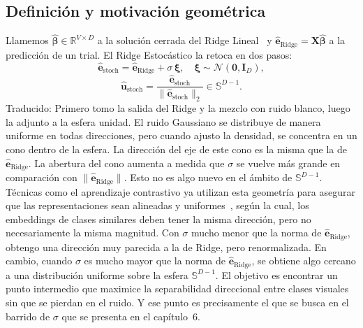 \subsection{Definición y motivación geométrica}

Llamemos $\hat{\boldsymbol{\beta}}\in\mathbb{R}^{V\times D}$ a la solución cerrada del Ridge 
Lineal~\cite{hoerl1970ridge,tikhonov1977solutions} y $\hat{\mathbf{e}}_{\text{Ridge}} = \mathbf{X}\hat{\boldsymbol{\beta}}$ 
a la predicción de un trial. El Ridge Estocástico la retoca en dos pasos:
\begin{equation}
\hat{\mathbf{e}}_{\text{stoch}} = \hat{\mathbf{e}}_{\text{Ridge}} + \sigma\,\boldsymbol{\xi}, \quad \boldsymbol{\xi}\sim\mathcal{N}(\mathbf{0},\mathbf{I}_D),
\end{equation}
\begin{equation}
\hat{\mathbf{u}}_{\text{stoch}} = \frac{\hat{\mathbf{e}}_{\text{stoch}}}{\|\hat{\mathbf{e}}_{\text{stoch}}\|_2} \in \mathbb{S}^{D-1}.
\end{equation}
Traducido: Primero tomo la salida del Ridge y la mezclo con ruido blanco, luego la adjunto a la esfera 
unidad. El ruido Gaussiano se distribuye de manera uniforme en todas direcciones, pero cuando ajusto la 
densidad, se concentra en un cono dentro de la esfera. La dirección del eje de este cono es la misma que 
la de $\hat{\mathbf{e}}_{\text{Ridge}}$. La abertura del cono aumenta a medida que $\sigma$ se vuelve más 
grande en comparación con $\|\hat{\mathbf{e}}_{\text{Ridge}}\|$. Esto no es algo nuevo en el ámbito de 
$\mathbb{S}^{D-1}$. Técnicas como el aprendizaje contrastivo ya utilizan esta geometría para asegurar 
que las representaciones sean alineadas y uniformes~\cite{vandenoord2018representation,liang2022mind}, 
según la cual, los embeddings de clases similares deben tener la misma dirección, pero no necesariamente 
la misma magnitud.
Con $\sigma$ mucho menor que la norma de $\hat{\mathbf{e}}_{\text{Ridge}}$, obtengo una dirección muy 
parecida a la de Ridge, pero renormalizada.
En cambio, cuando $\sigma$ es mucho mayor que la norma de $\hat{\mathbf{e}}_{\text{Ridge}}$, se obtiene 
algo cercano a una distribución uniforme sobre la esfera $\mathbb{S}^{D-1}$.
El objetivo es encontrar un punto intermedio que maximice la separabilidad direccional entre clases 
visuales sin que se pierdan en el ruido.
Y ese punto es precisamente el que se busca en el barrido de $\sigma$ que se presenta en el capítulo~6.

